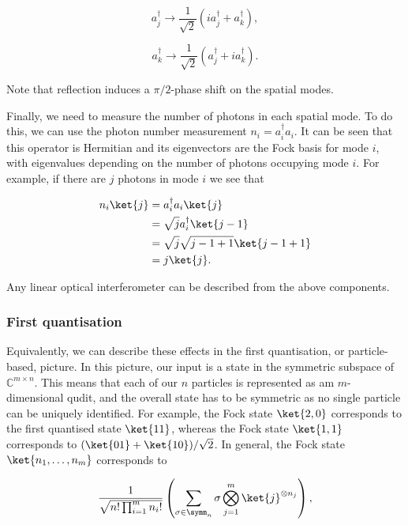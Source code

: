 \begin{equation}
a_j^\dagger \rightarrow \frac{1}{\sqrt{2}}(ia_j^\dagger + a_k^\dagger),
\end{equation}

\begin{equation}
a_k^\dagger \rightarrow \frac{1}{\sqrt{2}}(a_j^\dagger + ia_k^\dagger).
\end{equation}

Note that reflection induces a $\pi/2$-phase shift on the spatial modes.

Finally, we need to measure the number of photons in each spatial mode. To do this, we can use the photon number measurement $n_i = a_i^\dagger a_i$. It can be seen that this operator is Hermitian and its eigenvectors are the Fock basis for mode $i$, with eigenvalues depending on the number of photons occupying mode $i$. For example, if there are $j$ photons in mode $i$ we see that

\begin{align}
n_i\ket{j} &= a_i^\dagger a_i\ket{j}\\
&= \sqrt{j}a_i^\dagger\ket{j-1}\\
&= \sqrt{j}\sqrt{j-1+1}\ket{j-1+1}\\
&= j\ket{j}.
\end{align}

Any linear optical interferometer can be described from the above components.

\subsubsection{First quantisation}

Equivalently, we can describe these effects in the first quantisation, or particle-based, picture. In this picture, our input is a state in the symmetric subspace of $\mathbb{C}^{m\times n}$. This means that each of our $n$ particles is represented as am $m$-dimensional qudit, and the overall state has to be symmetric as no single particle can be uniquely identified. For example, the Fock state $\ket{2,0}$ corresponds to the first quantised state $\ket{11}$, whereas the Fock state $\ket{1,1}$ corresponds to $(\ket{01} + \ket{10})/\sqrt{2}$. In general, the Fock state $\ket{n_1,\dots,n_m}$ corresponds to

\begin{equation}
\frac{1}{\sqrt{n!\prod_{i=1}^mn_i!}}\left(\sum_{\sigma\in\symm_n}\sigma\bigotimes_{j=1}^m\ket{j}^{\otimes n_j}\right),
\end{equation}


